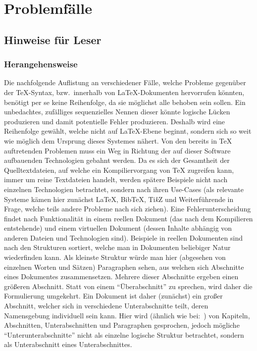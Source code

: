 \section{Problemfälle}
\subsection{Hinweise für Leser}
\subsubsection*{Herangehensweise}
Die nachfolgende Auflistung an verschiedener Fälle, welche Probleme gegenüber der \TeX{}-Syntax, bzw.\ innerhalb von \LaTeX{}-Dokumenten hervorrufen könnten, benötigt per se keine Reihenfolge, da sie möglichst alle behoben sein sollen. Ein unbedachtes, zufälliges sequenzielles Nennen dieser könnte logische Lücken produzieren und damit potentielle Fehler produzieren. 
Deshalb wird eine Reihenfolge gewählt, welche nicht auf \LaTeX{}-Ebene beginnt, sondern sich so weit wie möglich dem Ursprung dieses Systemes nähert.
Von den bereits in \TeX{} auftretenden Problemen muss ein Weg in Richtung der auf dieser Software aufbauenden Technologien gebahnt werden. Da es sich der Gesamtheit der Quelltextdateien, auf welche ein Kompiliervorgang von \TeX{} zugreifen kann, immer um reine Textdateien handelt, werden spätere Beispiele nicht nach einzelnen Technologien betrachtet, sondern nach ihren Use-Cases (als relevante Systeme kämen hier zunächst \LaTeX{}, Bib\TeX{}, Ti\textit{k}Z und Weiterführende in Frage, welche teils andere Probleme nach sich ziehen).%
Eine Fehlerunterscheidung findet nach Funktionalität in einem reellen Dokument (das nach dem Kompilieren entstehende) und einem virtuellen Dokument (dessen Inhalte abhängig von anderen Dateien und Technologien sind). 
Beispiele in reellen Dokumenten sind nach den Strukturen sortiert, welche man in Dokumenten beliebiger Natur wiederfinden kann. Als kleinste Struktur würde man hier (abgesehen von einzelnen Worten und Sätzen) Paragraphen sehen, aus welchen sich Abschnitte eines Dokumentes zusammensetzen. Mehrere dieser Abschnitte ergeben einen größeren Abschnitt. Statt von einem \enquote{Überabschnitt} zu sprechen, wird daher die Formulierung umgekehrt. Ein Dokument ist daher (zunächst) ein großer Abschnitt, welcher sich in verschiedene Unterabschnitte teilt, deren Namensgebung individuell sein kann. Hier wird (ähnlich wie bei:~\cite{texbook}) von Kapiteln, Abschnitten, Unterabschnitten und Paragraphen gesprochen, jedoch mögliche \enquote{Unterunterabschnitte} nicht als einzelne logische Struktur betrachtet, sondern als Unterabschnitt eines Unterabschnittes. 
